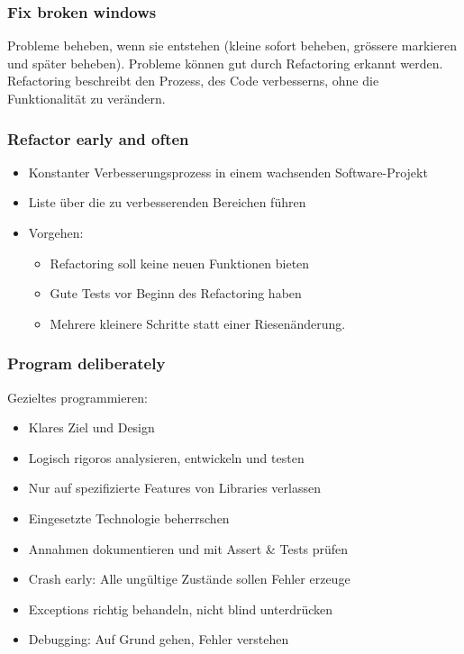 \subsubsection{Fix broken windows}

Probleme beheben, wenn sie entstehen (kleine sofort beheben, grössere markieren und später beheben). Probleme können gut durch Refactoring erkannt werden. Refactoring beschreibt den Prozess, des Code verbesserns, ohne die Funktionalität zu verändern.

\subsubsection{Refactor early and often}

\begin{itemize} 
	\item Konstanter Verbesserungsprozess in einem wachsenden Software-Projekt
	\item Liste über die zu verbesserenden Bereichen führen
	\item Vorgehen:
		\begin{itemize}
			\item Refactoring soll keine neuen Funktionen bieten
			\item Gute Tests vor Beginn des Refactoring haben
			\item Mehrere kleinere Schritte statt einer Riesenänderung.
		\end{itemize}
\end{itemize}

\subsubsection{Program deliberately}

Gezieltes programmieren:
\begin{itemize}
	\item Klares Ziel und Design
	\item Logisch rigoros analysieren, entwickeln und testen
	\item Nur auf spezifizierte Features von Libraries verlassen
	\item Eingesetzte Technologie beherrschen
	\item Annahmen dokumentieren und mit Assert \& Tests prüfen
	\item Crash early: Alle ungültige Zustände sollen Fehler erzeuge
	\item Exceptions richtig behandeln, nicht blind unterdrücken
	\item Debugging: Auf Grund gehen, Fehler verstehen
\end{itemize}


